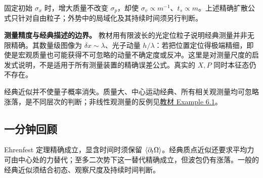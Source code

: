 固定初始 $\sigma_x$ 时，增大质量不改变 $\sigma_p$，却使 $\sigma_v\propto m^{-1}$、$t_s\propto m$。上述精确扩散公式只针对自由粒子；外势中的局域化及其持续时间须另行判断。

\textbf{测量精度与经典描述的边界。}
教材用有限波长的光定位粒子说明经典测量并非无限精确。其数量级图像为 $\delta x\sim\lambda$、光子动量 $h/\lambda$：若把位置定位得极端精细，即使是宏观质量也可能获得不可忽略的动量不确定度或反冲。这里是对测量尺度的启发式说明，不是适用于所有测量装置的精确误差公式。真实的 $X,P$ 同时本征态仍不存在。

经典近似并不使量子概率消失。质量大、中心运动经典、所有相关观测量均可忽略涨落，是不同层次的判断；非线性观测量的反例见\hyperref[exercise:QM-C06-S01-E01]{教材 Example 6.1}。

\subsection{一分钟回顾}
Ehrenfest 定理精确成立，显含时间时须保留 $\left\langle \partial_t\Omega \right\rangle$。经典质点近似还要求平均力可由中心处的力替代；至多二次势下这一替代精确成立，但波包仍有涨落。一般的经典近似须结合初态、观察尺度及持续时间判断。
